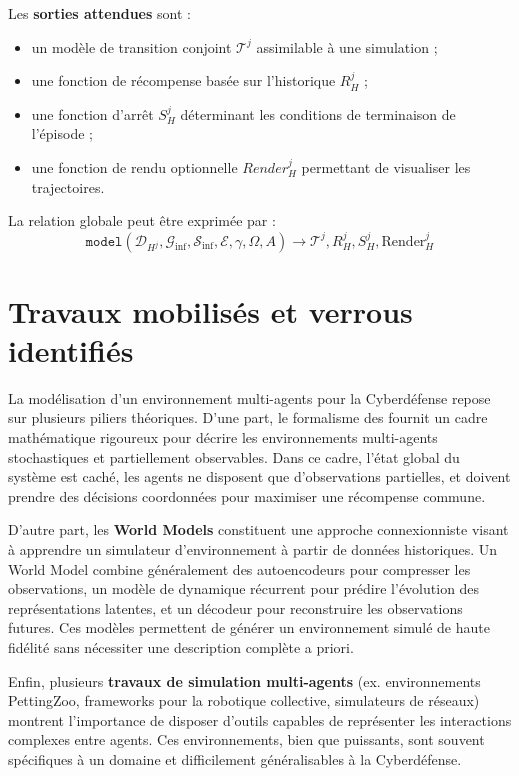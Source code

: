 Les \textbf{sorties attendues} sont :
\begin{itemize}
  \item un modèle de transition conjoint $\mathcal{T}^j$ assimilable à une simulation ;
  \item une fonction de récompense basée sur l'historique $R^j_H$ ;
  \item une fonction d'arrêt $S^j_H$ déterminant les conditions de terminaison de l'épisode ;
  \item une fonction de rendu optionnelle $Render^j_H$ permettant de visualiser les trajectoires.
\end{itemize}

La relation globale peut être exprimée par :
\begin{displaymath}
  \texttt{model}(\mathcal{D}_{H^j}, \mathcal{G}_{\text{inf}}, \mathcal{S}_{\text{inf}}, \mathcal{E}, \gamma, \Omega, A) \rightarrow \mathcal{T}^j, R^j_H, S^j_H, \text{Render}^j_H
\end{displaymath}

\section{Travaux mobilisés et verrous identifiés}

La modélisation d'un environnement multi-agents pour la Cyberdéfense repose sur plusieurs piliers théoriques.
D'une part, le formalisme des \textbf{} fournit un cadre mathématique rigoureux pour décrire les environnements multi-agents stochastiques et partiellement observables.
Dans ce cadre, l'état global du système est caché, les agents ne disposent que d'observations partielles, et doivent prendre des décisions coordonnées pour maximiser une récompense commune.

D'autre part, les \textbf{World Models} constituent une approche connexionniste visant à apprendre un simulateur d'environnement à partir de données historiques.
Un World Model combine généralement des autoencodeurs pour compresser les observations, un modèle de dynamique récurrent pour prédire l'évolution des représentations latentes, et un décodeur pour reconstruire les observations futures.
Ces modèles permettent de générer un environnement simulé de haute fidélité sans nécessiter une description complète a priori.

Enfin, plusieurs \textbf{travaux de simulation multi-agents} (ex. environnements PettingZoo, frameworks pour la robotique collective, simulateurs de réseaux) montrent l'importance de disposer d'outils capables de représenter les interactions complexes entre agents.
Ces environnements, bien que puissants, sont souvent spécifiques à un domaine et difficilement généralisables à la Cyberdéfense.

